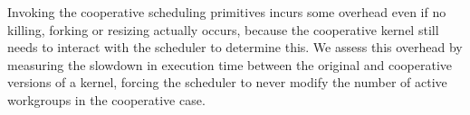 \documentclass[sigconf]{acmart}
\begin{document}
{%

%
%
%

Invoking the cooperative scheduling primitives incurs some overhead
even if no killing, forking or resizing actually occurs, because the cooperative kernel still needs to interact with the scheduler to determine this.
We assess this overhead by measuring the
 slowdown in execution time between the original and cooperative versions of a kernel, forcing the scheduler to never modify the number of
active workgroups in the cooperative case.

}
\end{document}

